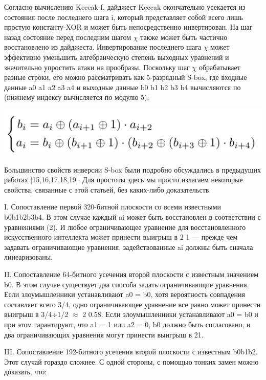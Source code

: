 \documentclass[utf8,14pt,a4paper,oneside,russian]{book}
\begin{document}
Согласно вычислению Keccak-f, дайджест Keccak окончательно усекается из
состояния после последнего шага i, который представляет собой всего лишь простую константу-XOR и может быть
непосредственно инвертирован. На шаг назад состояние перед последним шагом $\chi$ также может
быть частично восстановлено из дайджеста. Инвертирование последнего шага $\chi$ может эффективно
уменьшить алгебраическую степень выходных уравнений и
значительно упростить атаки на прообразы.
Поскольку шаг $\chi$ обрабатывает разные строки, его можно рассматривать как 5-разрядный S-box,
где входные данные a0 a1 a2 a3 a4 и выходные данные b0 b1 b2 b3 b4 вычисляются по (нижнему индексу
вычисляется по модулю 5):

\begin{center}
    \includegraphics*[scale=0.5]{6}\\
\end{center}

Большинство свойств инверсии S-box были подробно обсуждались в предыдущих
работах [15,16,17,18,19]. Для простоты здесь мы просто излагаем некоторые свойства, связанные
с этой статьей, без каких-либо доказательств.

I. Сопоставление первой 320-битной плоскости со всеми известными b0b1b2b3b4.
В этом случае каждый ai может быть восстановлен в соответствии с уравнениями (2). И любое
ограничивающее уравнение для восстановленного искусственного интеллекта может принести выигрыш в 2
1 — прежде чем задавать
ограничивающие уравнения, задействованные ai должны быть сначала линеаризованы.

II. Сопоставление 64-битного усечения второй плоскости с известным значением b0.
В этом случае существует два способа задать ограничивающие уравнения. Если злоумышленники устанавливают
a0 = b0, хотя вероятность совпадения составляет всего 3/4, одно ограничивающее уравнение
все равно может принести выигрыш в 3/4÷1/2 $\approx$ 2
0.58. Если злоумышленники устанавливают a0 = b0 и при
этом гарантируют, что a1 = 1 или a2 = 0, b0 должно быть согласовано, и два ограничивающих уравнения могут
принести выигрыш в 21.

III. Сопоставление 192-битного усечения второй плоскости с известным b0b1b2.
Этот случай гораздо сложнее. С одной стороны, с помощью тонких замен можно доказать, что:
\end{document}

